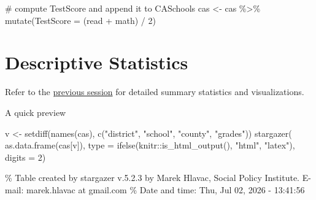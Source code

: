 \documentclass[
  12pt,
  letterpaper,
]{scrbook}
\newenvironment{Shaded}{\begin{snugshade}}{\end{snugshade}}
\newcommand{\AttributeTok}[1]{\textcolor[rgb]{0.40,0.45,0.13}{#1}}
\newcommand{\CommentTok}[1]{\textcolor[rgb]{0.37,0.37,0.37}{#1}}
\newcommand{\DecValTok}[1]{\textcolor[rgb]{0.68,0.00,0.00}{#1}}
\newcommand{\FunctionTok}[1]{\textcolor[rgb]{0.28,0.35,0.67}{#1}}
\newcommand{\NormalTok}[1]{\textcolor[rgb]{0.00,0.23,0.31}{#1}}
\newcommand{\OtherTok}[1]{\textcolor[rgb]{0.00,0.23,0.31}{#1}}
\newcommand{\SpecialCharTok}[1]{\textcolor[rgb]{0.37,0.37,0.37}{#1}}
\newcommand{\StringTok}[1]{\textcolor[rgb]{0.13,0.47,0.30}{#1}}
\theoremstyle{definition}
\theoremstyle{plain}
\theoremstyle{remark}
\begin{document}
\begin{Shaded}
\begin{Highlighting}[]
\CommentTok{\# compute TestScore and append it to CASchools}
\NormalTok{cas }\OtherTok{\textless{}{-}}\NormalTok{ cas }\SpecialCharTok{\%\textgreater{}\%}
  \FunctionTok{mutate}\NormalTok{(}\AttributeTok{TestScore =}\NormalTok{ (read }\SpecialCharTok{+}\NormalTok{ math) }\SpecialCharTok{/} \DecValTok{2}\NormalTok{)}
\end{Highlighting}
\end{Shaded}

\section{Descriptive Statistics}\label{descriptive-statistics}

Refer to the
\hyperref[descriptive-analysis-and-data-visualization-with-caschools]{previous
session} for detailed summary statistics and visualizations.

A quick preview

\begin{Shaded}
\begin{Highlighting}[]
\NormalTok{v }\OtherTok{\textless{}{-}} \FunctionTok{setdiff}\NormalTok{(}\FunctionTok{names}\NormalTok{(cas), }\FunctionTok{c}\NormalTok{(}\StringTok{"district"}\NormalTok{, }\StringTok{"school"}\NormalTok{, }\StringTok{"county"}\NormalTok{, }\StringTok{"grades"}\NormalTok{))}
\FunctionTok{stargazer}\NormalTok{(}
  \FunctionTok{as.data.frame}\NormalTok{(cas[v]), }
  \AttributeTok{type =} \FunctionTok{ifelse}\NormalTok{(knitr}\SpecialCharTok{::}\FunctionTok{is\_html\_output}\NormalTok{(), }\StringTok{"html"}\NormalTok{, }\StringTok{"latex"}\NormalTok{), }
  \AttributeTok{digits =} \DecValTok{2}\NormalTok{)}
\end{Highlighting}
\end{Shaded}

\% Table created by stargazer v.5.2.3 by Marek Hlavac, Social Policy
Institute. E-mail: marek.hlavac at gmail.com \% Date and time: Thu, Jul
02, 2026 - 13:41:56
\end{document}
